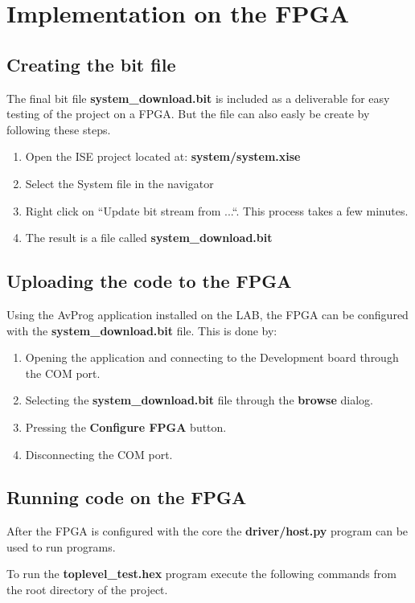 \section{Implementation on the FPGA}

\subsection{Creating the bit file}
The final bit file {\bf system\_download.bit} is included as a deliverable for easy testing of the project on a FPGA. But the file can also easly be create by following these steps.


\begin{enumerate}
	\item Open the ISE project located at:
		{\bf system/system.xise}
	\item Select the System file in the navigator
  \item Right click on ``Update bit stream from ...``. This process takes a few minutes. 
	\item The result is a file called {\bf system\_download.bit}
\end{enumerate}


\subsection{Uploading the code to the FPGA}
Using the AvProg application installed on the LAB, the FPGA can be configured with the {\bf system\_download.bit} file.
This is done by:

\begin{enumerate}
\item Opening the application and connecting to the Development board through the COM port.
\item Selecting the {\bf system\_download.bit} file through the {\bf browse} dialog. 
\item Pressing the {\bf Configure FPGA} button.
\item Disconnecting the COM port. 
\end{enumerate}  

\subsection{Running code on the FPGA}
After the FPGA is configured with the core the {\bf driver/host.py} program can be used to run programs.

To run the {\bf toplevel\_test.hex} program execute the following commands from the root directory of the project.


